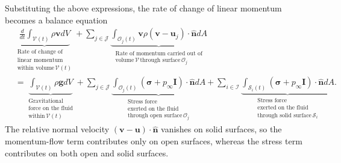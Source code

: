 Substituting the above expressions, the rate of change of linear momentum becomes a balance equation
\begin{align}
    &\underbrace{\frac{d}{dt}\int_{\mathcal{V}(t)}\rho\bm{v}dV}_{\substack{\text{Rate of change of}\\\text{linear momentum}\\\text{within volume}\,\mathcal{V}(t)}}+\sum_{j\in\mathcal{J}}\underbrace{\int_{\mathcal{O}_j(t)}\bm{v}\rho(\bm{v}-\bm{u}_j)\cdot\bm{\hat{n}} dA}_{\substack{\text{Rate of momentum carried out of}\\\text{volume}\,\mathcal{V}\,\text{through surface}\,\mathcal{O}_j}}\nonumber\\
    &
    =\underbrace{\int_{\mathcal{V}(t)}\rho\bm{g}dV}_{\substack{\text{Gravitational}\\\text{force on the fluid}\\\text{within}\,\mathcal{V}(t)}}
    +
    \sum_{j\in\mathcal{J}}\underbrace{\int_{\mathcal{O}_j(t)}(\bm{\sigma}+p_\infty\bm{I})\cdot\bm{\hat{n}} dA}_{\substack{\text{Stress force}\\\text{exerted on the fluid}\\\text{through open surface}\,\mathcal{O}_j}}+\sum_{i\in\mathcal{I}}\underbrace{\int_{\mathcal{S}_i(t)}(\bm{\sigma}+p_\infty\bm{I})\cdot\bm{\hat{n}}dA}_{\substack{\text{Stress force}\\\text{exerted on the fluid}\\\text{through solid surface}\,\mathcal{S}_i}}.
\end{align}
The relative normal velocity $(\bm{v}-\bm{u})\cdot\bm{\hat n}$ vanishes on solid surfaces, so the momentum-flow term contributes only on open surfaces, whereas the stress term contributes on both open and solid surfaces.

